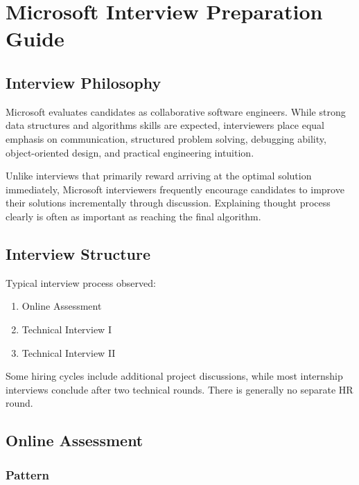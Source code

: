 \documentclass[11pt,a4paper]{article}
\begin{document}
\section{Microsoft Interview Preparation Guide}

\subsection{Interview Philosophy}

Microsoft evaluates candidates as collaborative software engineers. While strong data structures and algorithms skills are expected, interviewers place equal emphasis on communication, structured problem solving, debugging ability, object-oriented design, and practical engineering intuition.

Unlike interviews that primarily reward arriving at the optimal solution immediately, Microsoft interviewers frequently encourage candidates to improve their solutions incrementally through discussion. Explaining thought process clearly is often as important as reaching the final algorithm.


\subsection{Interview Structure}

Typical interview process observed:

\begin{enumerate}
	\item Online Assessment
	\item Technical Interview I
	\item Technical Interview II
\end{enumerate}

Some hiring cycles include additional project discussions, while most internship interviews conclude after two technical rounds. There is generally no separate HR round.


\subsection{Online Assessment}

\subsubsection{Pattern}
\end{document}
